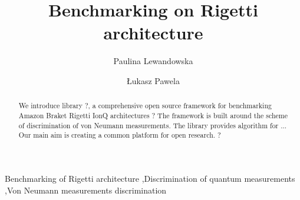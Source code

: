 \documentclass[preprint,12pt, a4paper]{elsarticle}
\newcommand{\1}{{\rm 1\hspace{-0.9mm}l}}
\begin{document}
\begin{frontmatter}



\title{Benchmarking on Rigetti architecture}


\author{Paulina Lewandowska}
\author{\L ukasz Pawela}

\address{Institute of Theoretical and Applied Informatics, Polish Academy
	of Sciences, Ba{\l}tycka 5, 44-100 Gliwice, Poland}

\begin{abstract}
We introduce library ?, a comprehensive open source framework for benchmarking 
Amazon Braket Rigetti IonQ architectures ? 
The framework is built around  the scheme of discrimination of von Neumann 
measurements. The library provides algorithm for ... Our main aim is creating a 
common platform  for open research.  ? 


\end{abstract}

\begin{keyword}
Benchmarking of Rigetti architecture \sep Discrimination of quantum 
measurements \sep Von Neumann measurements discrimination 



\end{keyword}

\end{frontmatter}
\end{document}
